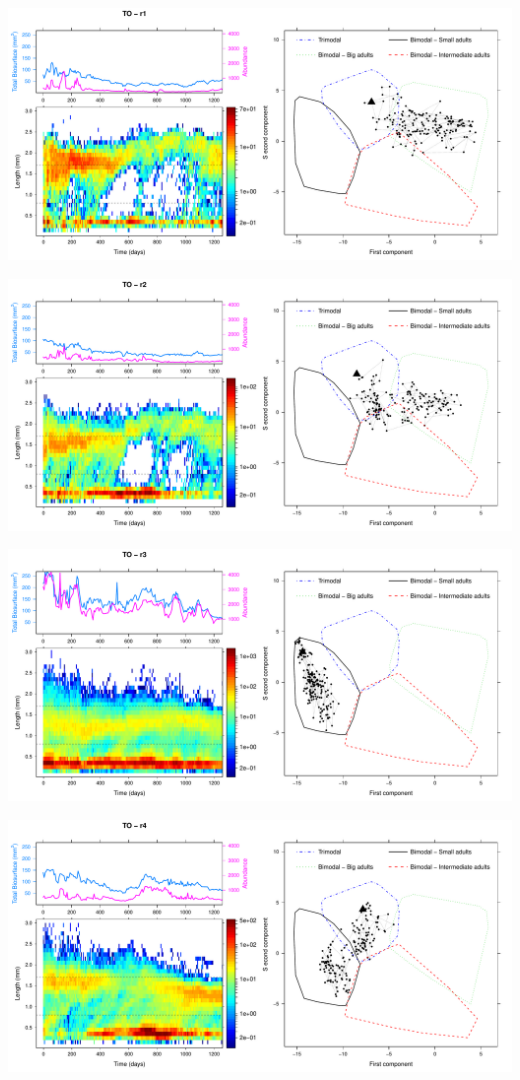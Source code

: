 \includegraphics[height=0.33\textheight]{3-1_ChapExp1/Fig/TO-21-r1}

\includegraphics[height=0.33\textheight]{3-1_ChapExp1/Fig/TO-21-r2}

\includegraphics[height=0.33\textheight]{3-1_ChapExp1/Fig/TO-21-r3}

\includegraphics[height=0.33\textheight]{3-1_ChapExp1/Fig/TO-21-r4}

